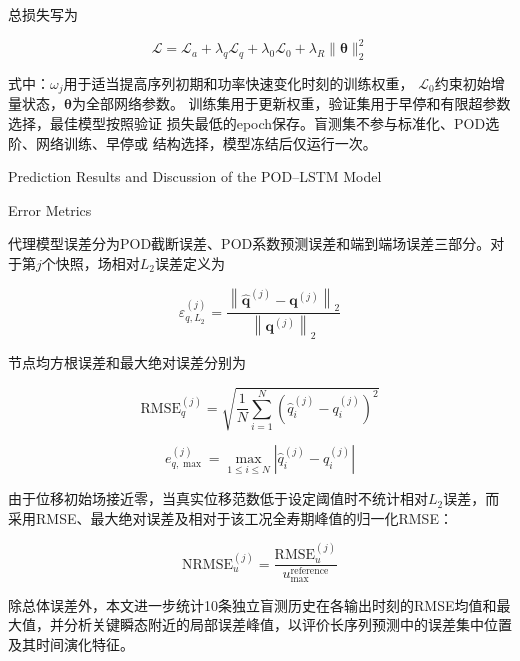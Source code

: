 总损失写为

\begin{equation}
	\mathcal L
	=
	\mathcal L_a
	+
	\lambda_q\mathcal L_q
	+
	\lambda_0\mathcal L_0
	+
	\lambda_R\|\boldsymbol\theta\|_2^2
	\label{eq:formal_lstm_total_loss}
\end{equation}

式中：$\omega_j$用于适当提高序列初期和功率快速变化时刻的训练权重，
$\mathcal L_0$约束初始增量状态，$\boldsymbol\theta$为全部网络参数。
训练集用于更新权重，验证集用于早停和有限超参数选择，最佳模型按照验证
损失最低的epoch保存。盲测集不参与标准化、POD选阶、网络训练、早停或
结构选择，模型冻结后仅运行一次。

{Prediction Results and Discussion of the POD--LSTM Model}

{Error Metrics}

代理模型误差分为POD截断误差、POD系数预测误差和端到端场误差三部分。对于第$j$个快照，场相对$L_2$误差定义为

\begin{equation}
	\varepsilon_{q,L_2}^{(j)}
	=
	\frac{
		\left\|
		\widehat{\boldsymbol{q}}^{(j)}
		-\boldsymbol{q}^{(j)}
		\right\|_2
	}{
		\left\|\boldsymbol{q}^{(j)}\right\|_2
	}
	\label{eq:surrogate_relative_l2_complete}
\end{equation}

节点均方根误差和最大绝对误差分别为

\begin{equation}
	\mathrm{RMSE}_{q}^{(j)}
	=
	\sqrt{
		\frac{1}{N}
		\sum_{i=1}^{N}
		\left(
		\widehat{q}_i^{(j)}-q_i^{(j)}
		\right)^2
	}
	\label{eq:surrogate_rmse_complete}
\end{equation}

\begin{equation}
	e_{q,\max}^{(j)}
	=
	\max_{1\le i\le N}
	\left|
	\widehat{q}_i^{(j)}-q_i^{(j)}
	\right|
	\label{eq:surrogate_max_error_complete}
\end{equation}

由于位移初始场接近零，当真实位移范数低于设定阈值时不统计相对$L_2$误差，而采用RMSE、最大绝对误差及相对于该工况全寿期峰值的归一化RMSE：

\begin{equation}
	\mathrm{NRMSE}_{u}^{(j)}
	=
	\frac{\mathrm{RMSE}_{u}^{(j)}}
	{u_{\max}^{\mathrm{reference}}}
	\label{eq:displacement_nrmse_complete}
\end{equation}

除总体误差外，本文进一步统计10条独立盲测历史在各输出时刻的RMSE均值和最大值，并分析关键瞬态附近的局部误差峰值，以评价长序列预测中的误差集中位置及其时间演化特征。

